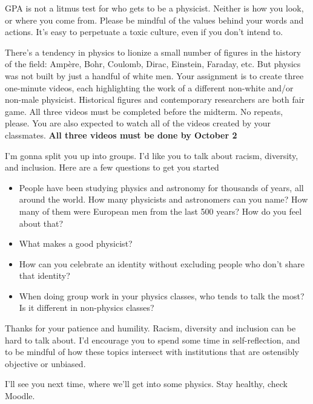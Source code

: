 \documentclass[10pt]{article}
\renewenvironment{quote}{\begin{shaded*}\begin{oldquote}}{\end{oldquote}\end{shaded*}}
\begin{document}
GPA is not a litmus test for who gets to be a physicist. Neither is how you look, or where you come from. Please be mindful of the values behind your words and actions. It's easy to perpetuate a toxic culture, even if you don't intend to. 

\begin{quote}
    There's a tendency in physics to lionize a small number of figures in the history of the field: Amp\`ere, Bohr, Coulomb, Dirac, Einstein, Faraday, etc. But physics was not built by just a handful of white men. Your assignment is to create three one-minute videos, each highlighting the work of a different non-white and/or non-male physicist. Historical figures and contemporary researchers are both fair game. All three videos must be completed before the midterm. No repeats, please. You are also expected to watch all of the videos created by your classmates. \textbf{All three videos must be done by October 2}
\end{quote}

I'm gonna split you up into groups. I'd like you to talk about racism, diversity, and inclusion. Here are a few questions to get you started

\begin{itemize}

    \item People have been studying physics and astronomy for thousands of years, all around the world. How many physicists and astronomers can you name? How many of them were European men from the last 500 years? How do you feel about that?

    \item What makes a good physicist?

    \item How can you celebrate an identity without excluding people who don't share that identity?

    \item When doing group work in your physics classes, who tends to talk the most? Is it different in non-physics classes?
\end{itemize}

Thanks for your patience and humility. Racism, diversity and inclusion can be hard to talk about. I'd encourage you to spend some time in self-reflection, and to be mindful of how these topics intersect with institutions that are ostensibly objective or unbiased.

I'll see you next time, where we'll get into some physics. Stay healthy, check Moodle. 
\end{document}
